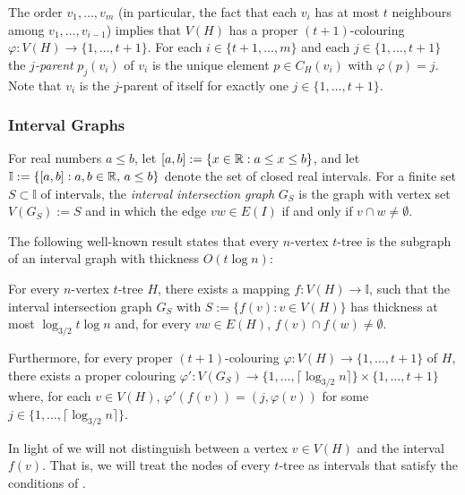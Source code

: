 \documentclass[kpfonts]{patmorin}
\begin{document}
The order $v_1,\ldots,v_m$ (in particular, the fact that each $v_i$ has at most $t$ neighbours among $v_1,\ldots,v_{i-1}$) implies that $V(H)$ has a proper $(t+1)$-colouring $\varphi:V(H)\to\{1,\ldots,t+1\}$.  For each $i\in\{t+1,\ldots,m\}$ and each $j\in\{1,\ldots,t+1\}$ the \emph{$j$-parent} $p_j(v_i)$ of $v_i$ is the unique element $p\in C_H(v_i)$ with $\varphi(p)=j$.  Note that $v_i$ is the $j$-parent of itself for exactly one $j\in\{1,\ldots,t+1\}$.

\subsubsection{Interval Graphs}

For real numbers $a\le b$, let $[a,b]:=\{ x\in\mathbb{R}: a\le x\le b\}$, and let
$\mathbb{I}:=\{[a,b]: a,b\in\mathbb{R},\, a\le b\}$ denote the set of closed real intervals.  For a finite set $S\subset\mathbb{I}$ of intervals, the \emph{interval intersection graph} $G_S$ is the graph with vertex set $V(G_S):=S$ and in which the edge $vw\in E(I)$ if and only if $v\cap w\neq \emptyset$.  


The following well-known result states that every $n$-vertex $t$-tree is the subgraph of an interval graph with thickness $O(t\log n)$:

\begin{lem}
  For every $n$-vertex $t$-tree $H$, there exists a mapping $f:V(H)\to\mathbb{I}$, such that the interval intersection graph $G_S$ with $S:=\{f(v):v\in V(H)\}$ has thickness at most $\log_{3/2} t\log n$ and, for every $vw\in E(H)$, $f(v)\cap f(w)\neq\emptyset$.  
  
  Furthermore, for every proper $(t+1)$-colouring $\varphi:V(H)\to\{1,\ldots,t+1\}$ of $H$, there exists a proper colouring $\varphi':V(G_S)\to\{1,\ldots,\lceil\log_{3/2} n\rceil\}\times\{1,\ldots,t+1\}$ where, for each $v\in V(H)$, $\varphi'(f(v))=(j,\varphi(v))$ for some $j\in\{1,\ldots,\lceil\log_{3/2} n\rceil\}$.
\end{lem}

In light of  we will not distinguish between a vertex $v\in V(H)$ and the interval $f(v)$.  That is, we will treat the nodes of every $t$-tree as intervals that satisfy the conditions of .
\end{document}
